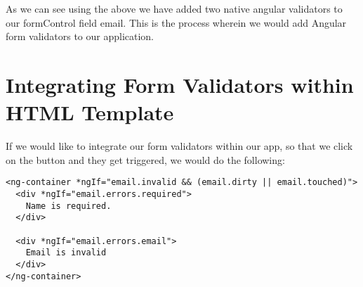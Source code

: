As we can see using the above we have added two native angular validators to
our formControl field email. This is the process wherein we would add Angular 
form validators to our application. 

\section{Integrating Form Validators within HTML Template}
If we would like to integrate our form validators within our app, so that we 
click on the button and they get triggered, we would do the following: 

\begin{lstlisting}[caption=Integrate Form Validation with HTML]
<ng-container *ngIf="email.invalid && (email.dirty || email.touched)">
  <div *ngIf="email.errors.required">
    Name is required.
  </div>

  <div *ngIf="email.errors.email">
    Email is invalid
  </div>
</ng-container>
\end{lstlisting}